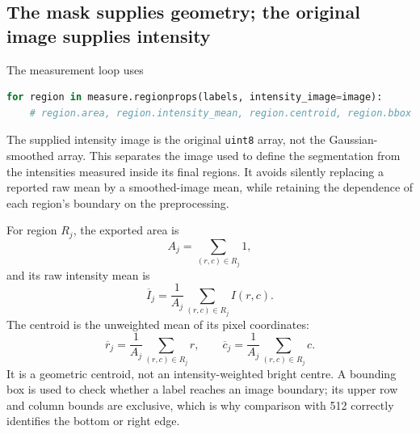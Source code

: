 \documentclass[11pt,letterpaper]{article}
\newcommand{\field}[1]{\nolinkurl{#1}}
\begin{document}
\subsection{The mask supplies geometry; the original image supplies intensity}
The measurement loop uses
\begin{lstlisting}[language=Python]
for region in measure.regionprops(labels, intensity_image=image):
    # region.area, region.intensity_mean, region.centroid, region.bbox
\end{lstlisting}
The supplied intensity image is the original \field{uint8} array, not the Gaussian-smoothed array. This separates the image used to define the segmentation from the intensities measured inside its final regions.\cite{measure} It avoids silently replacing a reported raw mean by a smoothed-image mean, while retaining the dependence of each region's boundary on the preprocessing.

For region $R_j$, the exported area is
\begin{equation}
A_j=\sum_{(r,c)\in R_j}1,
\end{equation}
and its raw intensity mean is
\begin{equation}
\overline{I}_j=\frac{1}{A_j}\sum_{(r,c)\in R_j}I(r,c).
\end{equation}
The centroid is the unweighted mean of its pixel coordinates:
\begin{equation}
\overline{r}_j=\frac{1}{A_j}\sum_{(r,c)\in R_j}r,
\qquad
\overline{c}_j=\frac{1}{A_j}\sum_{(r,c)\in R_j}c.
\end{equation}
It is a geometric centroid, not an intensity-weighted bright centre. A bounding box is used to check whether a label reaches an image boundary; its upper row and column bounds are exclusive, which is why comparison with 512 correctly identifies the bottom or right edge.
\end{document}

